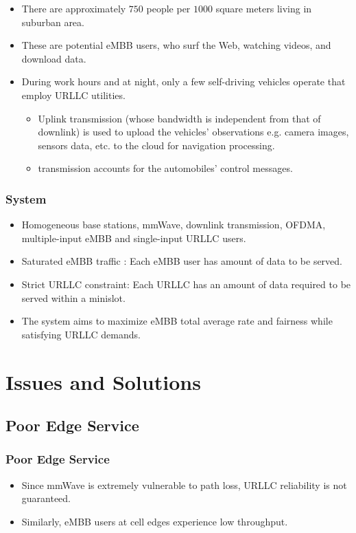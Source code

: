 \begin{frame}
  \begin{itemize}
    \item There are approximately $750$ people per $1000$ square meters living in suburban area\exampleFootnote \cite{F19}.
    \item These are potential eMBB users, who surf the Web, watching videos, and download data.
    \item During work hours and at night, only a few self-driving vehicles operate that employ URLLC utilities.
      \begin{itemize}
        \item Uplink transmission (whose bandwidth is independent from that of downlink) is used to upload the vehicles' observations e.g. camera images, sensors data, etc. to the cloud for navigation processing.
        \item {} transmission accounts for the automobiles' control messages.
      \end{itemize}
  \end{itemize}
\end{frame}

\begin{frame}
  \frametitle{System}
  \begin{itemize}
    \item Homogeneous base stations, mmWave, downlink transmission, OFDMA, multiple-input eMBB and single-input URLLC users.
    \item Saturated eMBB traffic \cite{S05}: Each eMBB user has  amount of data to be served.
    \item Strict URLLC constraint: Each URLLC has an amount of data required to be served within a minislot.
    \item The system aims to maximize eMBB total average rate and fairness while satisfying URLLC demands.
  \end{itemize}
\end{frame}

\section{Issues and Solutions}
\subsection{Poor Edge Service}
\begin{frame}
  \frametitle{Poor Edge Service}
  \begin{itemize}
    \item Since mmWave is extremely vulnerable to path loss, URLLC reliability is not guaranteed.
    \item Similarly, eMBB users at cell edges experience low throughput.
  \end{itemize}
\end{frame}

